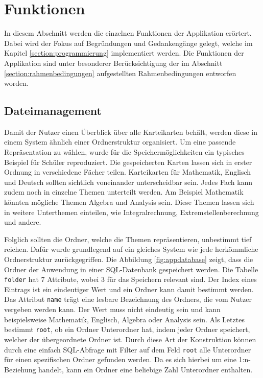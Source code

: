 
\section{Funktionen}
In diesem Abschnitt werden die einzelnen Funktionen der Applikation erörtert. Dabei wird der Fokus auf Begründungen und Gedankengänge gelegt, welche im Kapitel \ref{section:programmierung} implementiert werden. Die Funktionen der Applikation sind unter besonderer Berücksichtigung der im Abschnitt \ref{section:rahmenbedingungen} aufgestellten Rahmenbedingungen entworfen worden.

\subsection{Dateimanagement}
Damit der Nutzer einen Überblick über alle Karteikarten behält, werden diese in einem System ähnlich einer Ordnerstruktur organisiert. Um eine passende Repräsentation zu wählen, wurde für die Speichermöglichkeiten ein typisches Beispiel für Schüler reproduziert. Die gespeicherten Karten lassen sich in erster Ordnung in verschiedene Fächer teilen. Karteikarten für Mathematik, Englisch und Deutsch sollten sichtlich voneinander unterscheidbar sein. Jedes Fach kann zudem noch in einzelne Themen unterteilt werden. Am Beispiel Mathematik könnten mögliche Themen Algebra und Analysis sein. Diese Themen lassen sich in weitere Unterthemen einteilen, wie Integralrechnung, Extremstellenberechnung und andere. 

Folglich sollten die Ordner, welche die Themen repräsentieren, unbestimmt tief reichen. Dafür wurde grundlegend auf ein gleiches System wie jede herkömmliche Ordnerstruktur zurückgegriffen. Die Abbildung \ref{fig:appdatabase} zeigt, dass die Ordner der Anwendung in einer SQL-Datenbank gespeichert werden. Die Tabelle \texttt{folder} hat 7 Attribute, wobei 3 für das Speichern relevant sind. Der Index eines Eintrags ist ein eindeutiger Wert und ein Ordner kann damit bestimmt werden. Das Attribut \texttt{name} trägt eine lesbare Bezeichnung des Ordners, die vom Nutzer vergeben werden kann. Der Wert muss nicht eindeutig sein und kann beispielsweise Mathematik, Englisch, Algebra oder Analysis sein. Als Letztes bestimmt \texttt{root}, ob ein Ordner Unterordner hat, indem jeder Ordner speichert, welcher der übergeordnete Ordner ist. Durch diese Art der Konstruktion können durch eine einfach SQL-Abfrage mit Filter auf dem Feld \texttt{root} alle Unterordner für einen spezifischen Ordner gefunden werden. Da es sich hierbei um eine 1:n-Beziehung handelt, kann ein Ordner eine beliebige Zahl Unterordner enthalten.

